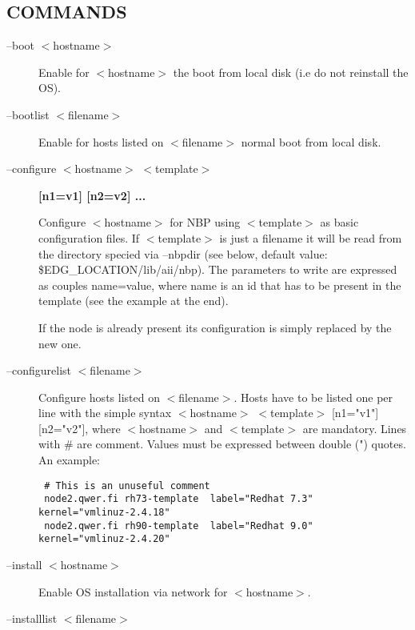 \subsection*{COMMANDS\label{edg-nbp_COMMANDS}}
\begin{description}

\item[--boot $<$hostname$>$] \mbox{}

Enable for $<$hostname$>$ the boot from local disk (i.e do not reinstall
the OS).


\item[--bootlist $<$filename$>$] \mbox{}

Enable for hosts listed on $<$filename$>$ normal boot from local disk.


\item[--configure $<$hostname$>$ $<$template$>$] \textbf{[n1=v1] [n2=v2] ...}

Configure $<$hostname$>$ for NBP using $<$template$>$ as basic
configuration files. If $<$template$>$ is just a filename it will be
read from the directory specied via --nbpdir (see below,
default value: \$EDG\_LOCATION/lib/aii/nbp). The parameters to write
are expressed as couples name=value, where name is an id that
has to be present in the template (see the example at the end).



If the node is already present its configuration is simply
replaced by the new one.


\item[--configurelist $<$filename$>$] \mbox{}

Configure hosts listed on $<$filename$>$. Hosts have to be listed one per line
with the simple syntax $<$hostname$>$ $<$template$>$ [n1="v1"] [n2="v2"], where $<$hostname$>$
and $<$template$>$ are mandatory. Lines with \# are comment.
Values must be expressed between double (") quotes.
An example:

\begin{verbatim}
 # This is an unuseful comment
 node2.qwer.fi rh73-template  label="Redhat 7.3" kernel="vmlinuz-2.4.18"
 node2.qwer.fi rh90-template  label="Redhat 9.0" kernel="vmlinuz-2.4.20"
\end{verbatim}

\item[--install $<$hostname$>$] \mbox{}

Enable OS installation via network for $<$hostname$>$.


\item[--installlist $<$filename$>$] \mbox{}


\end{description}
